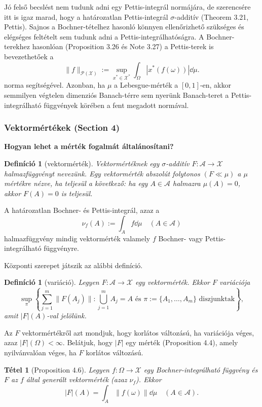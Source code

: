 \documentclass[handout]{beamer} %
\newtheorem{theo}[lem]{Tétel}
\newtheorem{defi}[lem]{Definíció}
\begin{document}
\begin{frame}
\justifying
Jó felső becslést nem tudunk adni egy Pettis-integrál normájára, de szerencsére itt is igaz marad, hogy a határozatlan Pettis-integrál $\sigma$-additív (Theorem 3.21, Pettis). Sajnos a Bochner-tételhez hasonló könnyen ellenőrizhető szükséges és elégséges feltételt sem tudunk adni a Pettis-integrálhatóságra.
A Bochner-terekhez hasonlóan (Proposition 3.26 és Note 3.27) a Pettis-terek is bevezethetőek a
$$
\|f\|_{\mathcal{P}(\mathcal{X})} := \sup_{x^* \in \mathcal{X}^*} \int_{\Omega} | x^*(f(\omega)) | \dd{\mu}.
$$
norma segítségével. Azonban, ha $\mu$ a Lebesgue-mérték a $[0,1]$-en, akkor semmilyen végtelen dimenziós Banach-térre sem nyerünk Banach-teret a Pettis-integrálható függvények körében a fent megadott normával.
\end{frame}

\begin{frame}
\justifying
\frametitle{Vektormértékek (Section 4)}
\textbf{Hogyan lehet a mérték fogalmát általánosítani?}
\begin{defi}[vektormérték]Vektormértéknek egy $\sigma$-additív  $F \colon \mathcal{A} \to \mathcal{X}$ halmazfüggvényt nevezünk. Egy vektormérték abszolút folytonos $(F \ll \mu)$ a $\mu$ mértékre nézve, ha teljesül a következő: ha egy $A \in \mathcal{A}$ halmazra $\mu(A) = 0$, akkor $F(A)=0$ is teljesül.
\end{defi}
A határozatlan Bochner- és Pettis-integrál, azaz a 
$$\nu_f(A) := \int_{A} f \dd{\mu} \quad (A \in \mathcal{A})$$
halmazfüggvény mindig vektormérték valamely $f$ Bochner- vagy Pettis-integrálható függvényre.
\end{frame}

\begin{frame}
\justifying
Központi szerepet játszik az alábbi definíció.
\begin{defi}[variáció]
Legyen $F\colon \mathcal{A} \to \mathcal{X}$ egy vektormérték. Ekkor $F$ variációja
$$\sup_{\pi} \left\lbrace \sum^{m}_{j=1} \| F(A_j) \| : \bigcup^{m}_{j=1} A_j = A \text{ és } \pi := \lbrace A_1, \ldots, A_m \rbrace \text{ diszjunktak} \right\rbrace,$$
amit $|F|(A)$-val jelölünk.
\end{defi}
Az $F$ vektormértékről azt mondjuk, hogy korlátos változású, ha variációja véges, azaz $|F|(\Omega) < \infty.$ Belátjuk, hogy $|F|$ egy mérték (Proposition 4.4), amely nyilvánvalóan véges, ha $F$ korlátos változású.
\begin{theo}[Proposition 4.6] Legyen $f \colon \Omega \to \mathcal{X}$ egy Bochner-integrálható függvény és $F$ az $f$ által generált vektormérték (azaz $\nu_f$). Ekkor 
$$|F|(A) = \int_{A} \| f(\omega) \| \dd{\mu} \quad (A \in \mathcal{A}).$$
\end{theo}
\end{frame}
\end{document}
